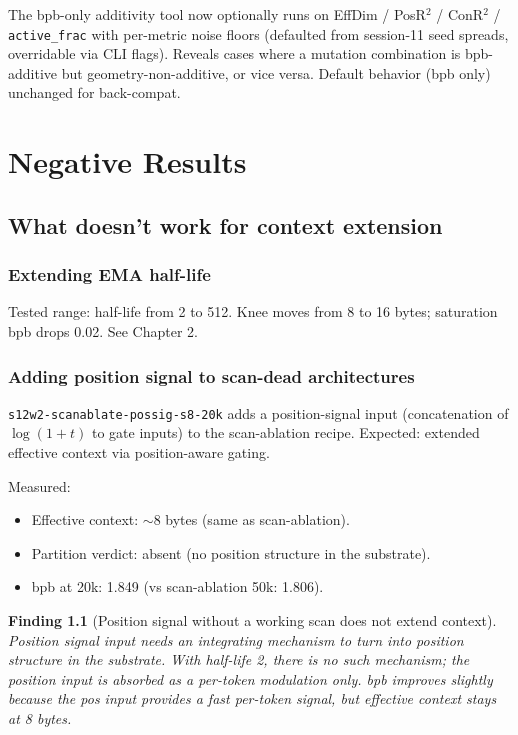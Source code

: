 \documentclass[11pt,openany]{book}
\newtheorem{finding}{Finding}[chapter]
\begin{document}
The bpb-only additivity tool now optionally runs on EffDim / PosR$^2$ /
ConR$^2$ / \texttt{active\_frac} with per-metric noise floors (defaulted
from session-11 seed spreads, overridable via CLI flags). Reveals cases
where a mutation combination is bpb-additive but geometry-non-additive, or
vice versa. Default behavior (bpb only) unchanged for back-compat.

\part{Negative Results}

\chapter{What doesn't work for context extension}
\label{ch:negative}

\section{Extending EMA half-life}

Tested range: half-life from 2 to 512. Knee moves from 8 to 16 bytes;
saturation bpb drops 0.02. See Chapter 2.

\section{Adding position signal to scan-dead architectures}

\texttt{s12w2-scanablate-possig-s8-20k} adds a position-signal input
(concatenation of $\log(1+t)$ to gate inputs) to the scan-ablation recipe.
Expected: extended effective context via position-aware gating.

Measured:
\begin{itemize}
  \item Effective context: $\sim 8$ bytes (same as scan-ablation).
  \item Partition verdict: absent (no position structure in the substrate).
  \item bpb at 20k: 1.849 (vs scan-ablation 50k: 1.806).
\end{itemize}

\begin{finding}[Position signal without a working scan does not extend
context]
Position signal input needs an integrating mechanism to turn into position
structure in the substrate. With half-life 2, there is no such mechanism;
the position input is absorbed as a per-token modulation only. bpb improves
slightly because the pos input provides a fast per-token signal, but
effective context stays at 8 bytes.
\end{finding}
\end{document}
